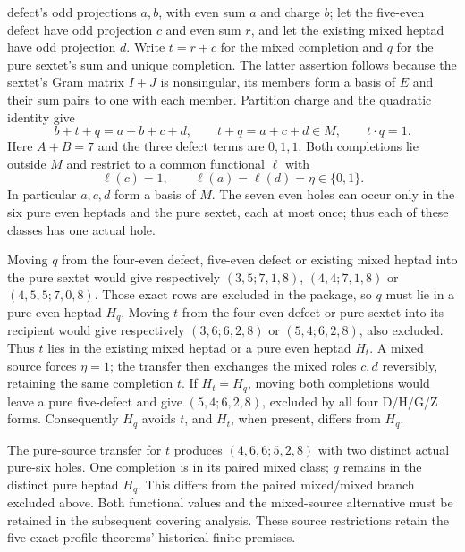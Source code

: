 defect's odd projections $a,b$, with even sum $a$ and charge $b$;
let the five-even defect have odd projection $c$ and even sum $r$,
and let the existing mixed heptad have odd projection $d$.
Write $t=r+c$ for the mixed completion and $q$ for the pure
sextet's sum and unique completion. The latter assertion follows
because the sextet's Gram matrix $I+J$ is nonsingular, its members
form a basis of $E$ and their sum pairs to one with each member.
Partition charge and the quadratic identity give
\[
 b+t+q=a+b+c+d,\qquad t+q=a+c+d\in M,\qquad t\cdot q=1.
\]
Here $A+B=7$ and the three defect terms are $0,1,1$.
Both completions lie outside $M$ and restrict to a common
functional $\ell$ with
\[
 \ell(c)=1,\qquad \ell(a)=\ell(d)=\eta\in\{0,1\}.
\]
In particular $a,c,d$ form a basis of $M$. The seven even holes
can occur only in the six pure even heptads and the pure sextet,
each at most once; thus each of these classes has one actual hole.

Moving $q$ from the four-even defect, five-even defect or existing
mixed heptad into the pure sextet would give respectively
$(3,5;7,1,8)$, $(4,4;7,1,8)$ or $(4,5,5;7,0,8)$.
Those exact rows are excluded in the package, so $q$ must lie
in a pure even heptad $H_q$. Moving $t$ from the four-even
defect or pure sextet into its recipient would give respectively
$(3,6;6,2,8)$ or $(5,4;6,2,8)$, also excluded.
Thus $t$ lies in the existing mixed heptad or a pure even heptad
$H_t$. A mixed source forces $\eta=1$; the transfer then exchanges
the mixed roles $c,d$ reversibly, retaining the same completion $t$.
If $H_t=H_q$, moving both completions would leave a pure
five-defect and give $(5,4;6,2,8)$, excluded by all four
D/H/G/Z forms. Consequently $H_q$ avoids $t$, and $H_t$,
when present, differs from $H_q$.

The pure-source transfer for $t$ produces $(4,6,6;5,2,8)$
with two distinct actual pure-six holes. One completion is in its
paired mixed class; $q$ remains in the distinct pure heptad $H_q$.
This differs from the paired mixed/mixed branch excluded above.
Both functional values and the mixed-source alternative must be
retained in the subsequent covering analysis. These source restrictions
retain the five exact-profile theorems' historical finite premises.

